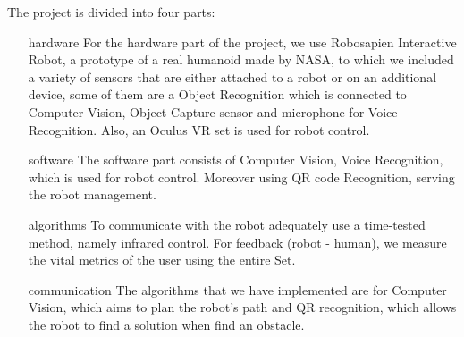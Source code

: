 \documentclass[documentation.tex]{subfiles}
\begin{document}
	The project is divided into four parts:
	\begin{itemize}
		\item[hardware] For the hardware part of the project, we use Robosapien Interactive Robot, a prototype of a real humanoid made by NASA, to which we included a variety of sensors that are either attached to a robot or on an additional device, some of them are a Object Recognition which is connected to Computer Vision, Object Capture sensor and microphone for Voice Recognition. Also, an Oculus VR set is used for robot control. \\
		\item[software] The software part consists of Computer Vision, Voice Recognition, which is used for robot control. Moreover using QR code Recognition, serving the robot management.
		\item[algorithms] To communicate with the robot adequately use a time-tested method, namely infrared control. For feedback (robot - human), we measure the vital metrics of the user using the entire Set.
		\item[communication] The algorithms that we have implemented are for Computer Vision, which aims to plan the robot's path and QR recognition, which allows the robot to find a solution when find an obstacle.
	\end{itemize}
\end{document}
